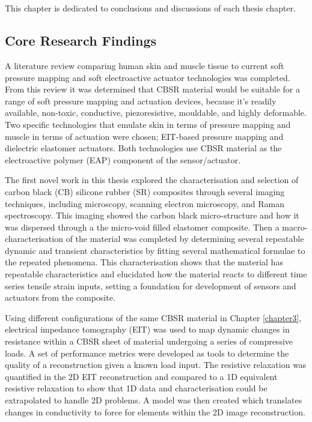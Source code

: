 \chapter{\chapviiiname}
\label{chapter8}
 This chapter is dedicated to conclusions and discussions of each thesis chapter.



\section{Core Research Findings}
A literature review comparing human skin and muscle tissue to current soft pressure mapping and soft electroactive actuator technologies was completed. From this review it was determined that CBSR material would be suitable for a range of soft pressure mapping and actuation devices, because it's readily available, non-toxic, conductive, piezoresistive, mouldable, and highly deformable. Two specific technologies that emulate skin in terms of pressure mapping and muscle in terms of actuation were chosen; EIT-based pressure mapping and dielectric elastomer actuators. Both technologies use CBSR material as the electroactive polymer (EAP) component of the sensor/actuator.

The first novel work in this thesis explored the characterisation and selection of carbon black (CB) silicone rubber (SR) composites through several imaging techniques, including microscopy, scanning electron microscopy, and Raman spectroscopy. This imaging showed the carbon black micro-structure and how it was dispersed through a the micro-void filled elastomer composite. Then a macro-characterisation of the material was completed by determining several repeatable dynamic and transient characteristics by fitting several mathematical formulae to the repeated phenomena. This characterisation shows that the material has repeatable characteristics and elucidated how the material reacts to different time series tensile strain inputs, setting a foundation for development of sensors and actuators from the composite.

Using different configurations of the same CBSR material in Chapter \ref{chapter3}, electrical impedance tomography (EIT) was used to map dynamic changes in resistance within a CBSR sheet of material undergoing a series of compressive loads. A set of performance metrics were developed as tools to determine the quality of a reconstruction given a known load input. The resistive relaxation was quantified in the 2D EIT reconstruction and compared to a 1D equivalent resistive relaxation to show that 1D data and characterisation could be extrapolated to handle 2D problems. A model was then created which translates changes in conductivity to force for elements within the 2D image reconstruction. 

